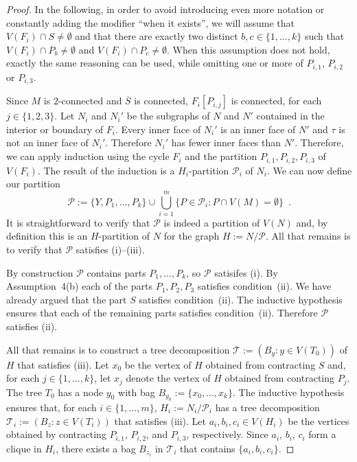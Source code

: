 \documentclass{patmorin}
\theoremstyle{plain}
\theoremstyle{definition}
\begin{document}
\begin{proof}
	In the following, in order to avoid introducing even more notation or constantly adding the modifier ``when it exists'', we will assume that $V(F_i)\cap S\neq\emptyset$ and that there are exactly two distinct $b,c\in\{1,\ldots,k\}$ such that $V(F_i)\cap P_b\neq\emptyset$ and $V(F_i)\cap P_c\neq\emptyset$.  When this assumption does not hold, exactly the same reasoning can be used, while omitting one or more of $P_{i,1}$, $P_{i,2}$ or $P_{i,3}$.

	Since $M$ is $2$-connected and $\overline{S}$ is connected, $F_i[P_{i,j}]$ is connected, for each $j\in\{1,2,3\}$.  Let $N_i$ and $N_i'$ be the subgraphs of $N$ and $N'$ contained in the interior or boundary of $F_i$.  Every inner face of $N_i'$ is an inner face of $N'$ and $\tau$ is not an inner face of $N_i'$.  Therefore $N_i'$ has fewer inner faces than $N'$.  Therefore, we can apply induction using the cycle $F_i$ and the partition $P_{i,1},P_{i,2},P_{i,3}$ of $V(F_i)$.  The result of the induction is a $H_i$-partition $\mathcal{P}_i$ of $N_i$.
	We can now define our partition
	\[
	\mathcal{P}:=\{Y, P_1,\ldots,P_k\} \cup \bigcup_{i=1}^m \{P\in\mathcal{P}_i: P\cap V(M)=\emptyset\} \enspace .
	\]
	It is straightforward to verify that $\mathcal{P}$ is indeed a partition of $V(N)$ and, by definition this is an $H$-partition of $N$ for the graph $H:=N/\mathcal{P}$.  All that remains is to verify that $\mathcal{P}$ satisfies (i)--(iii).

	By construction $\mathcal{P}$ contains parts $P_1,\ldots,P_k$, so $\mathcal{P}$ satisifes (i).  By Assumption~4(b) each of the parts $P_1,P_2,P_3$ satisfies condition~(ii).  We have already argued that the part $S$ satisfies condition~(ii).  The inductive hypothesis ensures that each of the remaining parts satisfies condition~(ii).   Therefore $\mathcal{P}$ satisfies (ii).

	All that remains is to construct a tree decomposition $\mathcal{T}:=(B_y:y\in V(T_0))$ of $H$ that satisfies (iii). Let $x_0$ be the vertex of $H$ obtained from contracting $S$ and, for each $j\in\{1,\ldots,k\}$, let $x_j$ denote the vertex of $H$ obtained from contracting $P_j$.  The tree $T_0$ has a node $y_0$ with bag $B_{y_0}:=\{x_0,\ldots,x_k\}$. The inductive hypothesis ensures that, for each $i\in\{1,\ldots,m\}$,  $H_i:=N_i/\mathcal{P}_i$ has a tree decomposition $\mathcal{T}_i:=(B_z:z\in V(T_i))$ that satisfies (iii).  Let $a_i,b_i,c_i\in V(H_i)$ be the vertices obtained by contracting $P_{i,1}$, $P_{i,2}$, and $P_{i,3}$, respectively. Since $a_i$, $b_i$, $c_i$ form a clique in $H_i$, there exists a bag $B_{z_i}$ in $\mathcal{T}_i$ that contains $\{a_i,b_i,c_i\}$.


\end{proof}
\end{document}
